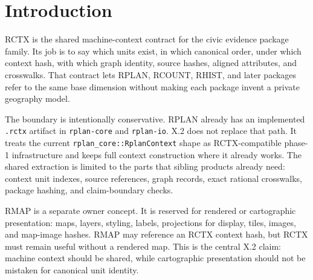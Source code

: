 \section{Introduction}

RCTX is the shared machine-context contract for the civic evidence package
family. Its job is to say which units exist, in which canonical order, under
which context hash, with which graph identity, source hashes, aligned
attributes, and crosswalks. That contract lets RPLAN, RCOUNT, RHIST, and later
packages refer to the same base dimension without making each package invent a
private geography model.

The boundary is intentionally conservative. RPLAN already has an implemented
\texttt{.rctx} artifact in \texttt{rplan-core} and \texttt{rplan-io}. X.2 does
not replace that path. It treats the current \texttt{rplan\_core::RplanContext}
shape as RCTX-compatible phase-1 infrastructure and keeps full context
construction where it already works. The shared extraction is limited to the
parts that sibling products already need: context unit indexes, source
references, graph records, exact rational crosswalks, package hashing, and
claim-boundary checks.

RMAP is a separate owner concept. It is reserved for rendered or cartographic
presentation: maps, layers, styling, labels, projections for display, tiles,
images, and map-image hashes. RMAP may reference an RCTX context hash, but RCTX
must remain useful without a rendered map. This is the central X.2 claim:
machine context should be shared, while cartographic presentation should not be
mistaken for canonical unit identity.
